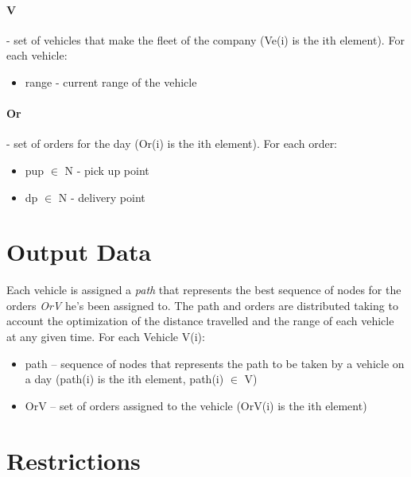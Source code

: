 \paragraph{V} - set of vehicles that make the fleet of the company (Ve(i) is the ith element). For each vehicle:
\begin{itemize}
	\item range - current range of the vehicle
\end{itemize}

\paragraph{Or} - set of orders for the day (Or(i) is the ith element). For each order:
\begin{itemize}
    \item pup $ \in $  N - pick up point
	\item dp $ \in $  N - delivery point
\end{itemize}


\section{Output Data}
Each vehicle is assigned a \textit{path} that represents the best sequence of nodes for the orders \textit{OrV} he's been assigned to. The path and orders are distributed taking to account the optimization of the distance travelled and the range of each vehicle at any given time.
For each Vehicle V(i):
\begin{itemize}
	\item path – sequence of nodes that represents the path to be taken by a vehicle on a day (path(i) is the ith element, path(i) $ \in $  V)
	\item OrV – set of orders assigned to the vehicle (OrV(i) is the ith element)
\end{itemize}


\section{Restrictions}

